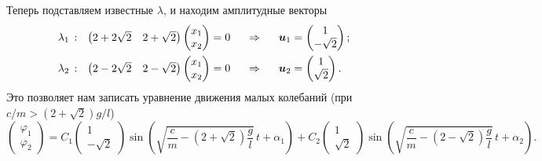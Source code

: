 Теперь подставляем известные $\lambda$, и находим амплитудные векторы
\begin{align*}
    &\lambda_1 \, : \ \
    \begin{pmatrix}
        2  +2 \sqrt{2} & 2 + \sqrt{2}
    \end{pmatrix}
    \begin{pmatrix}
        x_1 \\ x_2
    \end{pmatrix} = 0
    \hspace{0.5cm} \Rightarrow \hspace{0.5cm}
    \mbox{\boldmath $u$}_1 = \begin{pmatrix}
        1 \\ - \sqrt{2}
    \end{pmatrix}; \\
    &\lambda_2 \, : \ \
    \begin{pmatrix}
        2  -2 \sqrt{2} & 2 - \sqrt{2}
    \end{pmatrix}
    \begin{pmatrix}
        x_1 \\ x_2
    \end{pmatrix} = 0
    \hspace{0.5cm} \Rightarrow \hspace{0.5cm}
    \mbox{\boldmath $u$}_2 = \begin{pmatrix}
        1 \\ \sqrt{2}
    \end{pmatrix}.
\end{align*}
Это позволяет нам записать уравнение движения малых колебаний (при $c/m > (2+\sqrt{2}) g / l$)
\begin{equation*}
    \begin{pmatrix}
        \varphi_1 \\
        \varphi_2
    \end{pmatrix} = 
    C_1 \begin{pmatrix}
        1 \\ - \sqrt{2}
    \end{pmatrix}
    \sin \left(
        \sqrt{\frac{c}{m} - \left(2 + \sqrt{2}\right) \frac{g}{l}} \, t + \alpha_1
    \right) + 
    C_2 \begin{pmatrix}
        1 \\ \sqrt{2}
    \end{pmatrix}
    \sin \left(
        \sqrt{\frac{c}{m} - \left(2-\sqrt{2}\right) \frac{g}{l}} \, t + \alpha_2
    \right).
\end{equation*}


